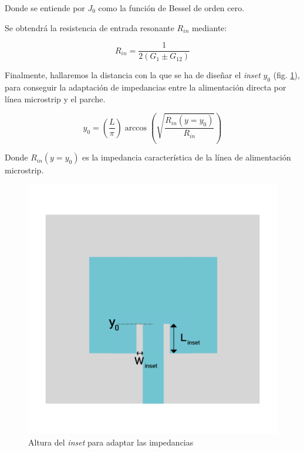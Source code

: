 Donde se entiende por \textit{$J_{0}$} como la función de Bessel de orden cero.
\\
\par Se obtendrá la resistencia de entrada resonante \textit{$R_{in}$} mediante:

\begin{equation}
	R_{in}=\frac{1}{2(G_{1}\pm G_{12})}
	\label{eq:rin}
\end{equation}

\par Finalmente, hallaremos la distancia con la que se ha de diseñar el  \textit{inset} \textit{$y_{0}$} (fig. \ref{fig:inset}),  para conseguir la adaptación de impedancias entre la alimentación directa por línea microstrip y el parche.

\begin{equation}
	y_{0}=\left ( \frac{L}{\pi} \right )\arccos\left ( \sqrt{\frac{R_{in}(y=y_{0})}{R_{in}}} \right )
	\label{eq:yo}
\end{equation}

Donde \textit{$R_{in}(y=y_{0})$} es la impedancia característica de la línea de alimentación microstrip.

\begin{figure}[h]
    \centering
        \includegraphics[width=12cm]{archivos/parche/inset}
        \caption{Altura del \textit{inset} para adaptar las impedancias}
        \label{fig:inset}
\end{figure}


